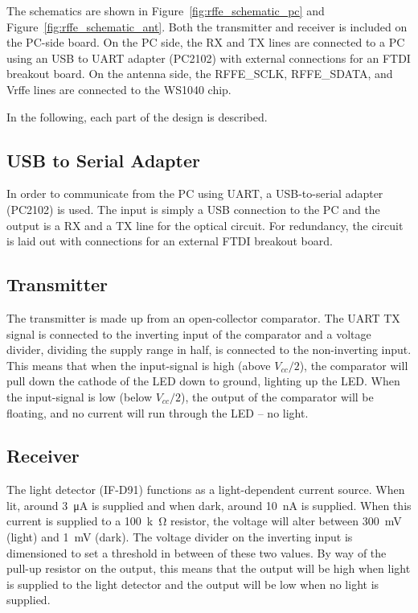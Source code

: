 The schematics are shown in Figure~\ref{fig:rffe_schematic_pc} and Figure~\ref{fig:rffe_schematic_ant}. Both the transmitter and receiver is included on the PC-side board. On the PC side, the RX and TX lines are connected to a PC using an USB to UART adapter (PC2102) with external connections for an FTDI breakout board. On the antenna side, the RFFE\_SCLK, RFFE\_SDATA, and Vrffe lines are connected to the WS1040 chip.

In the following, each part of the design is described.

\subsection{USB to Serial Adapter}
In order to communicate from the PC using UART, a USB-to-serial adapter (PC2102) is used. The input is simply a USB connection to the PC and the output is a RX and a TX line for the optical circuit. For redundancy, the circuit is laid out with connections for an external FTDI breakout board.

\subsection{Transmitter}
The transmitter is made up from an open-collector comparator. The UART TX signal is connected to the inverting input of the comparator and a voltage divider, dividing the supply range in half, is connected to the non-inverting input. This means that when the input-signal is high (above $V_{cc}/2$), the comparator will pull down the cathode of the LED down to ground, lighting up the LED. When the input-signal is low (below $V_{cc}/2$), the output of the comparator will be floating, and no current will run through the LED -- no light.

\subsection{Receiver}
The light detector (IF-D91) functions as a light-dependent current source. When lit, around \SI{3}{\micro\ampere} is supplied and when dark, around \SI{10}{nA} is supplied. When this current is supplied to a \SI{100}{k\ohm} resistor, the voltage will alter between \SI{300}{mV} (light) and \SI{1}{mV} (dark). The voltage divider on the inverting input is dimensioned to set a threshold in between of these two values. By way of the pull-up resistor on the output, this means that the output will be high when light is supplied to the light detector and the output will be low when no light is supplied.

